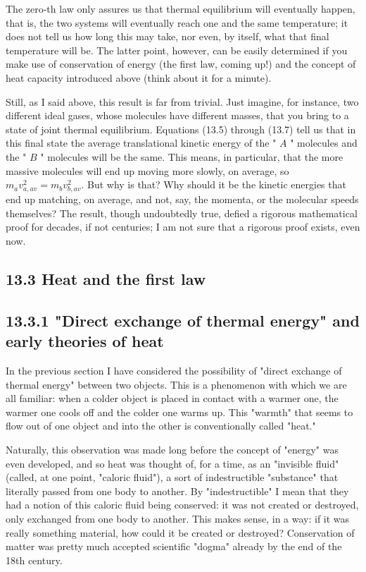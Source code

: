 \documentclass[10pt]{article}
\begin{document}
The zero-th law only assures us that thermal equilibrium will eventually happen, that is, the two systems will eventually reach one and the same temperature; it does not tell us how long this may take, nor even, by itself, what that final temperature will be. The latter point, however, can be easily determined if you make use of conservation of energy (the first law, coming up!) and the concept of heat capacity introduced above (think about it for a minute).

Still, as I said above, this result is far from trivial. Just imagine, for instance, two different ideal gases, whose molecules have different masses, that you bring to a state of joint thermal equilibrium. Equations (13.5) through (13.7) tell us that in this final state the average translational kinetic energy of the " $A$ " molecules and the " $B$ " molecules will be the same. This means, in particular, that the more massive molecules will end up moving more slowly, on average, so $m_{a} v_{a, a v}^{2}=m_{b} v_{b, a v}^{2}$. But why is that? Why should it be the kinetic energies that end up matching, on average, and not, say, the momenta, or the molecular speeds themselves? The result, though undoubtedly true, defied a rigorous mathematical proof for decades, if not centuries; I am not sure that a rigorous proof exists, even now.

\subsection*{13.3 Heat and the first law}
\subsection*{13.3.1 "Direct exchange of thermal energy" and early theories of heat}
In the previous section I have considered the possibility of "direct exchange of thermal energy" between two objects. This is a phenomenon with which we are all familiar: when a colder object is placed in contact with a warmer one, the warmer one cools off and the colder one warms up. This "warmth" that seems to flow out of one object and into the other is conventionally called "heat."

Naturally, this observation was made long before the concept of "energy" was even developed, and so heat was thought of, for a time, as an "invisible fluid" (called, at one point, "caloric fluid"), a sort of indestructible "substance" that literally passed from one body to another. By "indestructible" I mean that they had a notion of this caloric fluid being conserved: it was not created or destroyed, only exchanged from one body to another. This makes sense, in a way: if it was really something material, how could it be created or destroyed? Conservation of matter was pretty much accepted scientific "dogma" already by the end of the 18th century.
\end{document}
